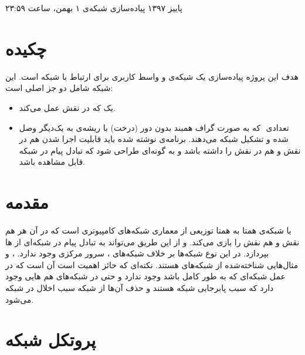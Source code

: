 \documentclass{article}
\begin{document}
    \handout
    {}
    {}
    {پاییز ۱۳۹۷}
    {پیاده‌سازی شبکه‌ی }
    {۱ بهمن، ساعت ۲۳:۵۹}
    
    \vspace{0.3cm}
     
\section{چکیده}

   هدف این پروژه پیاده‌سازی یک شبکه‌ی  و واسط کاربری برای ارتباط با شبکه است.  این شبکه شامل دو جز اصلی است: 

\begin{itemize}
   \item   	یک  که در نقش  عمل می‌کند.

\item تعدادی ‌ که به صورت گراف همبند بدون دور (درخت) با ریشه‌ی  به یک‌دیگر وصل شده و تشکیل شبکه می‌دهند.
   برنامه‌ی نوشته شده باید قابلیت اجرا شدن هم در نقش  و هم در نقش  را داشته باشد و به گونه‌ای طراحی شود که تبادل پیام در شبکه قابل مشاهده باشد.
\end{itemize}
 



\section{مقدمه}
 یا شبکه‌ی همتا به همتا توزیعی از معماری شبکه‌های کامپیوتری است که در آن هر  هم نقش  و هم نقش  را بازی می‌کند. و از این طریق می‌تواند به تبادل پیام در شبکه‌ای از ها بپردازد. در این نوع شبکه‌ها بر خلاف شبکه‌های ، سرور مرکزی وجود ندارد. ،  و  مثال‌هایی شناخته‌شده از شبکه‌های  هستند. نکته‌ای که حائز اهمیت است آن است که در عمل شبکه‌ای که به طور کامل  باشد وجود ندارد و حتی در شبکه‌های  هم هایی وجود دارد که سبب پابرجایی شبکه هستند و حذف آن‌ها از شبکه سبب اخلال در شبکه می‌شود.



\section{پروتکل شبکه}
\end{document}

